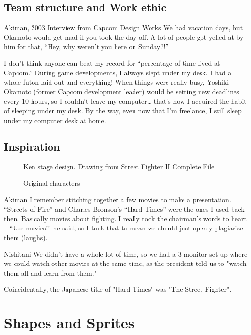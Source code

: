 
\subsection{Team structure and Work ethic}


\begin{q}{Akiman, 2003 Interview from Capcom Design Works}
  We had vacation days, but Okamoto would get mad if you took the day off. A lot of people got yelled at by him for that, “Hey, why weren’t you here on Sunday?!”

  I don’t think anyone can beat my record for “percentage of time lived at Capcom.” During game developments, I always slept under my desk. I had a whole futon laid out and everything! When things were really busy, Yoshiki Okamoto (former Capcom development leader) would be setting new deadlines every 10 hours, so I couldn’t leave my computer… that’s how I acquired the habit of sleeping under my desk. By the way, even now that I’m freelance, I still sleep under my computer desk at home.
  \end{q}

\subsection{Inspiration}
 \begin{figure}[H]
\caption*{Ken stage design. Drawing from Street Fighter II Complete File}
\end{figure}

\begin{figure}[H]
\caption*{Original characters}
\end{figure}

\begin{q}{Akiman\cite{ffdevinterview}}
I remember stitching together a few movies to make a presentation. “Streets of Fire” and Charles Bronson’s “Hard Times” were the ones I used back then. Basically movies about fighting. I really took the chairman’s words to heart – “Use movies!” he said, so I took that to mean we should just openly plagiarize them (laughs).
\end{q}

\begin{q}{Nishitani\cite{ffdevinterview}}
We didn't have a whole lot of time, so we had a 3-monitor set-up where we could watch other movies at the same time, as the president told us to "watch them all and learn from them."
\end{q}

Coincidentally, the Japanese title of "Hard Times" was "The Street Fighter".

\section{Shapes and Sprites}
